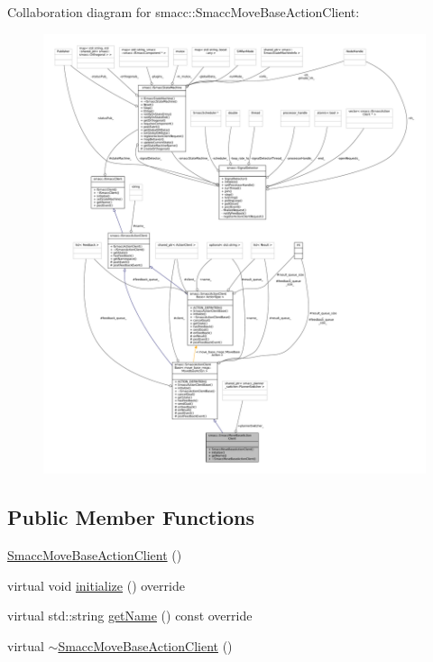 Collaboration diagram for smacc\+:\+:Smacc\+Move\+Base\+Action\+Client\+:
\nopagebreak
\begin{figure}[H]
\begin{center}
\leavevmode
\includegraphics[width=350pt]{classsmacc_1_1SmaccMoveBaseActionClient__coll__graph}
\end{center}
\end{figure}
\subsection*{Public Member Functions}
\begin{DoxyCompactItemize}
\item 
\hyperlink{classsmacc_1_1SmaccMoveBaseActionClient_aeb88a8a3a45c3fc5d89577316174fe00}{Smacc\+Move\+Base\+Action\+Client} ()
\item 
virtual void \hyperlink{classsmacc_1_1SmaccMoveBaseActionClient_ae520045638a5f722ad1367f6d705b7c4}{initialize} () override
\item 
virtual std\+::string \hyperlink{classsmacc_1_1SmaccMoveBaseActionClient_ac90f555fadd3b3c9394aca537a9962f4}{get\+Name} () const override
\item 
virtual \hyperlink{classsmacc_1_1SmaccMoveBaseActionClient_a10e2971e7ff4b55a1861abe233d3c24f}{$\sim$\+Smacc\+Move\+Base\+Action\+Client} ()
\end{DoxyCompactItemize}
